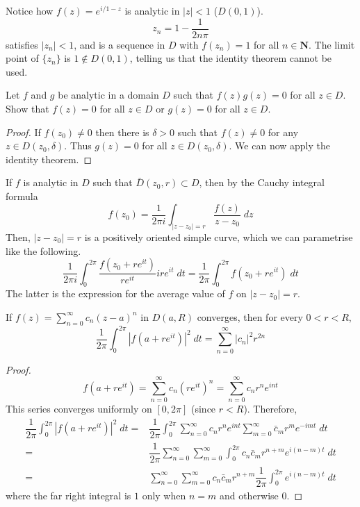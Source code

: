 \vspace{2ex}
\begin{ex}
Notice how $f(z)=e^{i/1-z}$ is analytic in $|z|<1$ ($D(0,1)$).
\[z_{n}=1-\dfrac{1}{2n\pi }\]
satisfies $|z_{n}|<1$, and is a sequence in $D$ with $f(z_{n})=1$ for all $n\in {\bm N}$. The limit point of $\{z_n\}$ is $1\notin D(0,1)$, telling us that the identity theorem cannot be used. 
\end{ex}
\vspace{2ex}
\begin{ex}
Let $f$ and $g$ be analytic in a domain $D$ such that $f(z)g(z)= 0$ for all $z\in D$. Show that $f(z)=0$ for all $z\in D$ or $g(z)=0$ for all  $z\in D$. 
\end{ex}
\vspace{2ex}
\begin{proof}
If $f(z_0)\ne 0$ then there is $\delta >0$ such that $f(z)\ne 0$ for any $z\in D(z_0,\delta )$. Thus $g(z)=0$ for all $z\in D(z_0,\delta )$. We can now apply the identity theorem.
\end{proof}
\vspace{2ex}
\begin{thm}
If $f$ is analytic in $D$ such that $\bar{D}(z_0,r)\subset D$, then by the Cauchy integral formula
\[f(z_0)=\dfrac{1}{2\pi i}\int _{|z-z_0|=r}\dfrac{f(z)}{z-z_0}\;dz\]
Then, $|z-z_0|=r$ is a positively oriented simple curve, which we can parametrise like the following.
\[\dfrac{1}{2\pi i}\int ^{2\pi }_{0}\dfrac{f(z_0+re^{it})}{re^{it}}ire^{it}\;dt=\dfrac{1}{2\pi }\int ^{2\pi }_{0}f(z_0+re^{it })\;dt\]
The latter is the expression for the average value of $f$ on $|z-z_0|=r$.
\end{thm}
\vspace{2ex}
\begin{thm}
If $f(z)=\sum ^{\infty }_{n=0}c_{n}(z-a)^{n}$ in $D(a,R)$ converges, then for every $0<r<R$,
\[\dfrac{1}{2\pi }\int ^{2\pi }_{0}|f(a+re^{it})|^2\;dt=\sum ^{\infty }_{n=0}|c_{n}|^2r^{2n}\]
\end{thm}
\vspace{2ex}
\begin{proof}
\[f(a+re^{it})=\sum ^{\infty }_{n=0}c_{n}(re^{it})^{n}=\sum ^{\infty }_{n=0}c_{n}r^{n}e^{int}\]
This series converges uniformly on $[0,2\pi ]$ (since $r<R$). Therefore,
\begin{align*}
\dfrac{1}{2\pi }\int ^{2\pi }_{0}|f(a+re^{it})|^2\;dt=&\dfrac{1}{2\pi }\int ^{2\pi }_{0}\sum ^{\infty }_{n=0}c_{n}r^{n}e^{int }\sum ^{\infty }_{m=0}\bar{c}_{m}r^{m}e^{-imt}\;dt\\
=&\dfrac{1}{2\pi }\sum ^{\infty }_{n=0}\sum ^{\infty }_{m=0}\int^{2\pi }_{0}c_{n}\bar{c}_{m}r^{n+m}e^{i(n-m)t}\;dt\\
=&\sum ^{\infty }_{n=0}\sum ^{\infty }_{m=0}c_{n}\bar{c}_{m}r^{n+m}\dfrac{1}{2\pi }\int ^{2\pi }_{0}e^{i(n-m)t}\;dt
\end{align*}
where the far right integral is $1$ only when $n=m$ and otherwise 0.
\end{proof}
